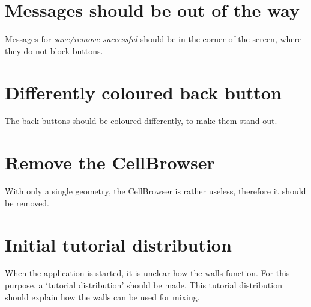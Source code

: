 \section*{Messages should be out of the way}
Messages for \emph{save/remove successful} should be in the corner of the screen, where they do not block buttons.

\section*{Differently coloured back button}
The back buttons should be coloured differently, to make them stand out.

\section*{Remove the CellBrowser}
With only a single geometry, the CellBrowser is rather useless, therefore it should be removed.

\section*{Initial tutorial distribution}
When the application is started, it is unclear how the walls function. For this purpose, a `tutorial distribution' should be made. This tutorial distribution should explain how the walls can be used for mixing.